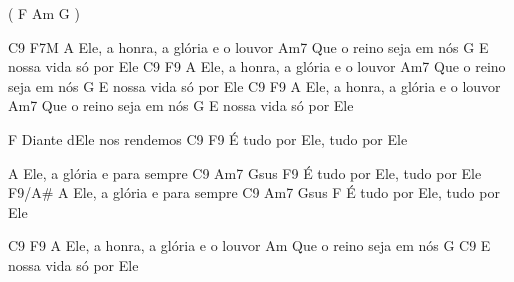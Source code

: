   ( F  Am  G )
\endverse

\beginverse
   C9                              F7M
  A Ele, a honra, a glória e o louvor
                      Am7
  Que o reino seja em nós
     G              
  E nossa vida só por Ele
    C9                              F9
  A Ele, a honra, a glória e o louvor
                      Am7
  Que o reino seja em nós
     G              
  E nossa vida só por Ele
    C9                              F9
  A Ele, a honra, a glória e o louvor
                      Am7
  Que o reino seja em nós
     G              
  E nossa vida só por Ele
\endverse

\beginverse
F 
  Diante dEle nos rendemos
    C9                        F9 
  É tudo por Ele, tudo por Ele

  A Ele, a glória e para sempre
     C9           Am7      Gsus   F9
  É tudo por Ele, tudo por Ele
                    F9/A#
  A Ele, a glória e para sempre
     C9            Am7       Gsus   F
  É tudo por Ele, tudo por Ele
\endverse

\beginverse
    C9                              F9
  A Ele, a honra, a glória e o louvor
                      Am
  Que o reino seja em nós
     G                          C9
  E nossa vida só por Ele

\endverse

\endsong
